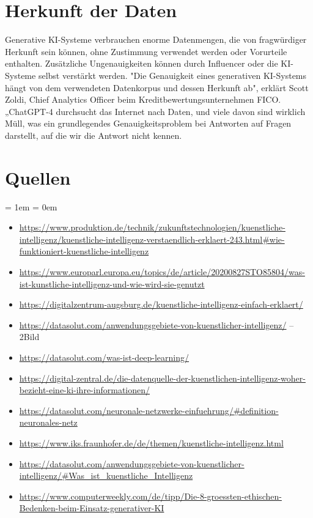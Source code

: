 \documentclass{report}
\begin{document}
   \section {Herkunft der Daten}

Generative KI-Systeme verbrauchen enorme Datenmengen, die 
 von fragwürdiger Herkunft sein können, ohne Zustimmung verwendet werden oder Vorurteile enthalten.
  Zusätzliche Ungenauigkeiten können durch Influencer oder die KI-Systeme selbst verstärkt werden.
  "Die Genauigkeit eines generativen KI-Systems hängt von dem verwendeten Datenkorpus und dessen Herkunft ab",
   erklärt Scott Zoldi, Chief Analytics Officer beim Kreditbewertungsunternehmen FICO. „ChatGPT-4 durchsucht das 
   Internet nach Daten, und viele davon sind wirklich Müll, was ein grundlegendes Genauigkeitsproblem bei Antworten auf Fragen 
   darstellt, auf die wir die Antwort nicht kennen.

\textbf{}
\textit{}






\section{Quellen}
\parskip = 1em %
\parindent = 0em %


\begin{itemize}
\item \url{https://www.produktion.de/technik/zukunftstechnologien/kuenstliche-intelligenz/kuenstliche-intelligenz-verstaendlich-erklaert-243.html#wie-funktioniert-kuenstliche-intelligenz}
\item \url{https://www.europarl.europa.eu/topics/de/article/20200827STO85804/was-ist-kunstliche-intelligenz-und-wie-wird-sie-genutzt}
\item \url{https://digitalzentrum-augsburg.de/kuenstliche-intelligenz-einfach-erklaert/}
\item \url{https://datasolut.com/anwendungsgebiete-von-kuenstlicher-intelligenz/} -- 2Bild
\item \url{https://datasolut.com/was-ist-deep-learning/} 
\item \url{https://digital-zentral.de/die-datenquelle-der-kuenstlichen-intelligenz-woher-bezieht-eine-ki-ihre-informationen/}
\item \url{https://datasolut.com/neuronale-netzwerke-einfuehrung/#definition-neuronales-netz}
\item \url{https://www.iks.fraunhofer.de/de/themen/kuenstliche-intelligenz.html}
\item \url{https://datasolut.com/anwendungsgebiete-von-kuenstlicher-intelligenz/#Was_ist_kuenstliche_Intelligenz}
\item \url{https://www.computerweekly.com/de/tipp/Die-8-groessten-ethischen-Bedenken-beim-Einsatz-generativer-KI}
\end{itemize}

\printbibliography
\end{document}
